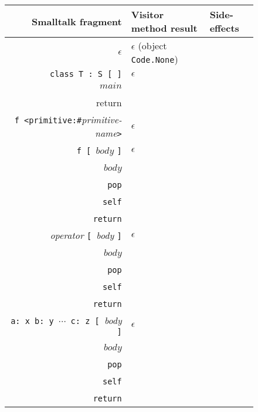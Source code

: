 \documentclass[11pt]{article}
\begin{document}
\begin{figure}
\begin{center}
\begin{tabular}[t]{r | l | l }
{\bf Smalltalk fragment} & {\bf Visitor method result} & {\bf Side-effects}\\
\hline
$\epsilon$ & $\epsilon$ (object {\tt Code.None}) & \\

{\tt class T : S [ ]} & $\epsilon$ & \\

$main$  & 
\begin{minipage}[t]{0.25\linewidth}
$main$\\
{\tt self\\
return}
\end{minipage} & \\

{\tt f <primitive:\#}{\it primitive-name}{\tt >} & $\epsilon$ & \\

{\tt f [ }$body$ {\tt ]} & $\epsilon$&
\begin{minipage}[t]{0.35\linewidth}
$\text{\tt f}_{\text{\it code}} =$ \\
\parbox{20pt}{~}$body$\\
\parbox{20pt}{~}{\tt pop}\\
\parbox{20pt}{~}{\tt self}\\
\parbox{20pt}{~}{\tt return}
\end{minipage} \\

{\it operator} {\tt [ }{\it body} {\tt ]} & $\epsilon$&
\begin{minipage}[t]{0.35\linewidth}
$\text{\it operator}_{\text{\it code}} =$ \\
\parbox{20pt}{~}$body$\\
\parbox{20pt}{~}{\tt pop}\\
\parbox{20pt}{~}{\tt self}\\
\parbox{20pt}{~}{\tt return}
\end{minipage} \\

{\tt a:\,x b:\,y $\cdots$ c:\,z [ }{\it body} {\tt ]}  & $\epsilon$&
\begin{minipage}[t]{0.35\linewidth}
$\text{\tt a:b:c:}_{\text{\it code}} =$ \\
\parbox{20pt}{~}$body$\\
\parbox{20pt}{~}{\tt pop}\\
\parbox{20pt}{~}{\tt self}\\
\parbox{20pt}{~}{\tt return}
\end{minipage} \\


\end{tabular}
\end{center}
\end{figure}
\end{document}
